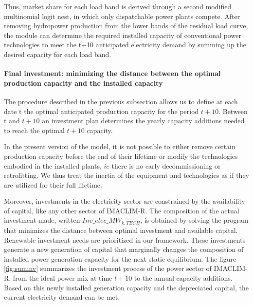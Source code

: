 Thus, market share for each load band is derived through a second modified multinomial logit nest, in which only dispatchable power plants compete. After removing hydropower production from the  lower bands of the residual load curve, the module can determine the required installed capacity of conventional power technologies to meet the t+10 anticipated electricity demand by summing up the desired capacity for each load band.



\paragraph{Final investment: minimizing the distance between the optimal production capacity and the installed capacity}

The procedure described in the previous subsection allows us to define at each date t the optimal anticipated production capacity for the period $t+10$. Between t and $t+10$ an investment plan determines the yearly capacity additions needed to reach the optimal $t+10$ capacity.

In the present version of the model, it is not possible to either remove certain production capacity before the end of their lifetime or modify the technologies embodied in the installed plants, $ie$ there is no early decommissioning or retrofitting. We thus treat the inertia of the equipment and technologies as if they are utilized for their full lifetime.

Moreover, investments in the electricity sector are constrained by the availability of capital, like any other sector of IMACLIM-R. The composition of the actual investment made, written $Inv\_elec\_MW_{k,TECH}$, is obtained by solving the program that minimizes the distance between optimal investment and available capital. Renewable investment needs are prioritized in our framework.
These investments generate a new generation of capital that marginally changes the composition of installed power generation capacity for the next static equilibrium. The figure \ref{fig:suminv} summarizes the investment process of the power sector of IMACLIM-R, from the ideal power mix at time $t+10$ to the annual capacity additions.
Based on this newly installed generation capacity and the depreciated capital, the current electricity demand can be met.


